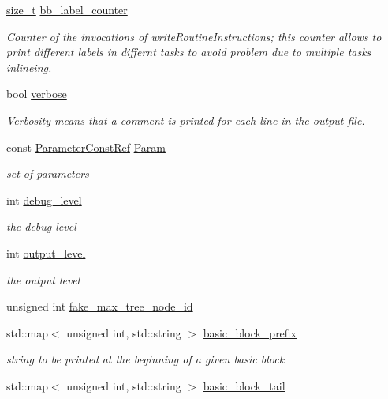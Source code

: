 \begin{DoxyCompactItemize}
\hyperlink{tutorial__fpt__2017_2intro_2sixth_2test_8c_a7c94ea6f8948649f8d181ae55911eeaf}{size\+\_\+t} \hyperlink{classCWriter_aed289d777116058d00df6f2d46430fb4}{bb\+\_\+label\+\_\+counter}
\begin{DoxyCompactList}\small\item\em Counter of the invocations of write\+Routine\+Instructions; this counter allows to print different labels in differnt tasks to avoid problem due to multiple tasks inlineing. \end{DoxyCompactList}\item 
bool \hyperlink{classCWriter_a8d5b6fe4a045d7e9ca997a566274cdb5}{verbose}
\begin{DoxyCompactList}\small\item\em Verbosity means that a comment is printed for each line in the output file. \end{DoxyCompactList}\item 
const \hyperlink{Parameter_8hpp_a37841774a6fcb479b597fdf8955eb4ea}{Parameter\+Const\+Ref} \hyperlink{classCWriter_a3555d61ac3540440862ed211800b80be}{Param}
\begin{DoxyCompactList}\small\item\em set of parameters \end{DoxyCompactList}\item 
int \hyperlink{classCWriter_a7f6d9454ff1aff00ebb5b97877f13dfd}{debug\+\_\+level}
\begin{DoxyCompactList}\small\item\em the debug level \end{DoxyCompactList}\item 
int \hyperlink{classCWriter_ae6a63f53399597601d3c0e34565d0bd3}{output\+\_\+level}
\begin{DoxyCompactList}\small\item\em the output level \end{DoxyCompactList}\item 
unsigned int \hyperlink{classCWriter_aa107c55b07202727edfcb0ef22d2c0ea}{fake\+\_\+max\+\_\+tree\+\_\+node\+\_\+id}
\item 
std\+::map$<$ unsigned int, std\+::string $>$ \hyperlink{classCWriter_a5c31c88bdb91ff32a3f0a277134af908}{basic\+\_\+block\+\_\+prefix}
\begin{DoxyCompactList}\small\item\em string to be printed at the beginning of a given basic block \end{DoxyCompactList}\item 
std\+::map$<$ unsigned int, std\+::string $>$ \hyperlink{classCWriter_ab389125a678d1021c5ea50b3e174310b}{basic\+\_\+block\+\_\+tail}

\end{DoxyCompactItemize}
